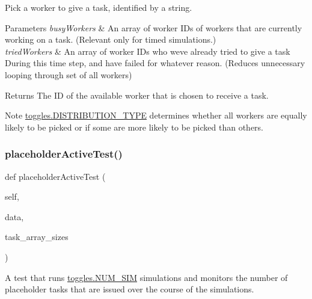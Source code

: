 Pick a worker to give a task, identified by a string. 


\begin{DoxyParams}{Parameters}
{\em busy\+Workers} & An array of worker I\+Ds of workers that are currently working on a task. (Relevant only for timed simulations.) \\
\hline
{\em tried\+Workers} & An array of worker I\+Ds who we\textquotesingle{}ve already tried to give a task During this time step, and have failed for whatever reason. (Reduces unnecessary looping through set of all workers) \\
\hline
\end{DoxyParams}
\begin{DoxyReturn}{Returns}
The ID of the available worker that is chosen to receive a task. 
\end{DoxyReturn}
\begin{DoxyNote}{Note}
\mbox{\hyperlink{namespacedynamicfilterapp_1_1toggles_aceed21fa0675802d2f756c7da43cb049}{toggles.\+D\+I\+S\+T\+R\+I\+B\+U\+T\+I\+O\+N\+\_\+\+T\+Y\+PE}} determines whether all workers are equally likely to be picked or if some are more likely to be picked than others. 
\end{DoxyNote}
\mbox{\label{classdynamicfilterapp_1_1test__simulations_1_1_simulation_test_ac0c6db97fdb6cea1796780b48515cb30}} 
\subsubsection{\texorpdfstring{placeholderActiveTest()}{placeholderActiveTest()}}
{\footnotesize\ttfamily def placeholder\+Active\+Test (\begin{DoxyParamCaption}\item[{}]{self,  }\item[{}]{data,  }\item[{}]{task\+\_\+array\+\_\+sizes }\end{DoxyParamCaption})}



A test that runs \mbox{\hyperlink{namespacedynamicfilterapp_1_1toggles_a3baf5565851cd87736238d8dddfc1106}{toggles.\+N\+U\+M\+\_\+\+S\+IM}} simulations and monitors the number of placeholder tasks that are issued over the course of the simulations. 


